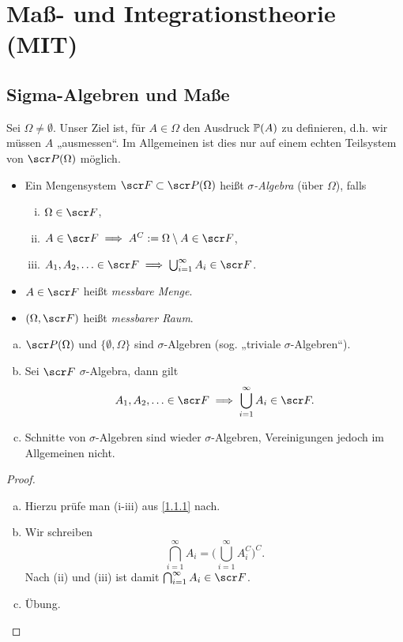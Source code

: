\chapter{Maß- und Integrationstheorie (MIT)}


\section{Sigma-Algebren und Maße}

Sei $\Omega \neq \emptyset$.
Unser Ziel ist, für $A \in \Omega$ den Ausdruck $\P(A)$ zu definieren, d.h. wir müssen $A$ „ausmessen“.
Im Allgemeinen ist dies nur auf einem echten Teilsystem von $\scr P(\Omega)$ möglich.

\begin{df} \label{1.1.1}
	\begin{itemize}
		\item
			Ein Mengensystem $\scr F \subset \scr P(\Omega)$ heißt \emph{$\sigma$-Algebra} (über $\Omega$), falls
			\begin{enumerate}[(i)]
				\item
					$\Omega \in \scr F$,
				\item
					$A \in \scr F \implies A^C := \Omega \setminus A \in \scr F$,
				\item
					$A_1, A_2, \dotsc \in \scr F \implies \bigcup_{i=1}^\infty A_i \in \scr F$.
			\end{enumerate}
		\item
			$A \in \scr F$ heißt \emph{messbare Menge}.
		\item
			$(\Omega, \scr F)$ heißt \emph{messbarer Raum}.
	\end{itemize}
\end{df}

\begin{nt} \label{1.1.2}
	\begin{enumerate}[(a)]
		\item
			$\scr P(\Omega)$ und $\{\emptyset, \Omega\}$ sind $\sigma$-Algebren (sog. „triviale $\sigma$-Algebren“).
		\item
			Sei $\scr F$ $\sigma$-Algebra, dann gilt
			\[
				A_1, A_2, \dotsc \in \scr F \implies \bigcup_{i=1}^\infty A_i \in \scr F.
			\]
		\item
			Schnitte von $\sigma$-Algebren sind wieder $\sigma$-Algebren, Vereinigungen jedoch im Allgemeinen nicht.
	\end{enumerate}
	\begin{proof}
		\begin{enumerate}[(a)]
			\item
				Hierzu prüfe man (i-iii) aus \ref{1.1.1} nach.
			\item
				Wir schreiben
				\[
					\bigcap_{i=1}^\infty A_i
					= \bigg( \bigcup_{i=1}^\infty A_i^C \bigg)^C.
				\]
				Nach (ii) und (iii) ist damit $\bigcap_{i=1}^\infty A_i \in \scr F$.
			\item
				Übung.
		\end{enumerate}
	\end{proof}
\end{nt}

